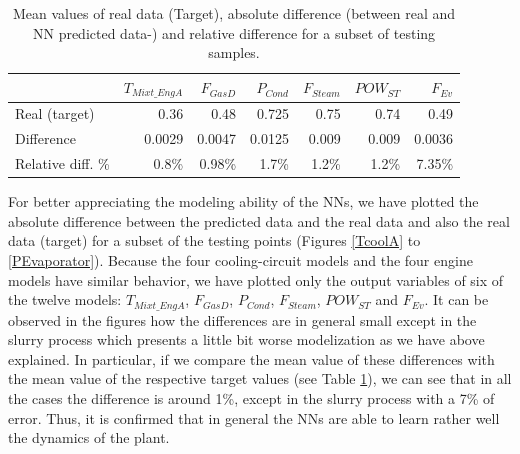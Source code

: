 \begin{table}[!t]
\caption{Mean values of  real data (Target), absolute difference (between real and NN predicted data-) and relative difference for a subset of testing samples.}
\label{tbl:diff}
  \centering
\begin{tabular}{lrrrrrr} \toprule
 & $T_{Mixt\_EngA}$ & $F_{GasD}$ & $P_{Cond}$ & $F_{Steam}$ & $POW_{ST}$ & $F_{Ev}$ \\ \midrule
Real (target) & 0.36 & 0.48 & 0.725 & 0.75 & 0.74 & 0.49 \\
Difference  & 0.0029 & 0.0047 & 0.0125 & 0.009 & 0.009 & 0.0036 \\
Relative diff. \%  & 0.8\%  & 0.98\% & 1.7\% & 1.2\% & 1.2\% & 7.35\%\\
 \bottomrule
\end{tabular}
\vspace{-0.3cm}

\end{table}

For better appreciating the modeling ability of the NNs, we have  plotted the absolute difference between the predicted data and the real data and also the real data (target) for a subset of the testing points (Figures \ref{TcoolA} to \ref{PEvaporator}). Because the four cooling-circuit models and the four engine models have similar behavior, we have plotted only the output variables of six of the twelve models: $T_{Mixt\_EngA}$, $F_{GasD}$, $P_{Cond}$, $F_{Steam}$, $POW_{ST}$ and $F_{Ev}$.  It can be observed in the figures how the differences are in general small except in the slurry process  which presents a little bit worse modelization as we have above explained.  In particular, if we compare the mean value of these differences with the mean value of the respective target values (see Table \ref{tbl:diff}), we can see that in all the cases the difference is around 1\%, except in the slurry process with a 7\% of error. Thus, it is confirmed that in general the NNs are able to learn rather well the dynamics of the plant. 





